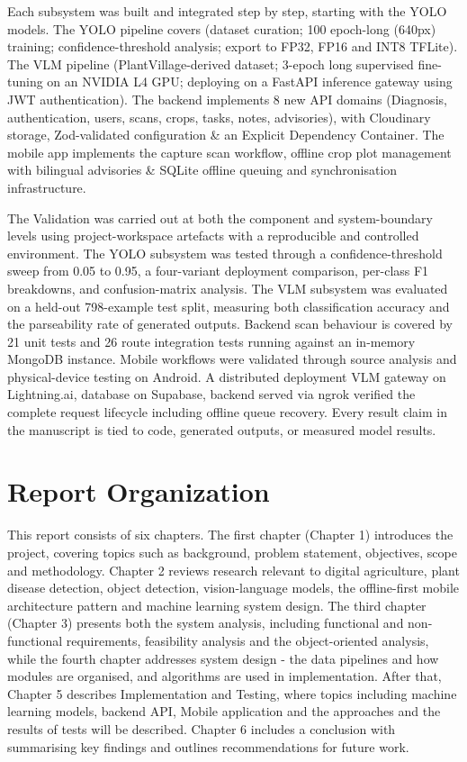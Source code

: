 
Each subsystem was built and integrated step by step, starting with the YOLO models. The YOLO pipeline covers (dataset curation; 100 epoch-long (640px) training; confidence-threshold analysis; export to FP32, FP16 and INT8 TFLite). The VLM pipeline (PlantVillage-derived dataset; 3-epoch long supervised fine-tuning on an NVIDIA L4 GPU; deploying on a FastAPI inference gateway using JWT authentication). The backend implements 8 new API domains (Diagnosis, authentication, users, scans, crops, tasks, notes, advisories), with Cloudinary storage, Zod-validated configuration \& an Explicit Dependency Container. The mobile app implements the capture scan workflow, offline crop plot management with bilingual advisories \& SQLite offline queuing and synchronisation infrastructure.


The Validation was carried out at both the component and system-boundary levels using project-workspace artefacts with a reproducible and controlled environment. The YOLO subsystem was tested through a confidence-threshold sweep from 0.05 to 0.95, a four-variant deployment comparison, per-class F1 breakdowns, and confusion-matrix analysis. The VLM subsystem was evaluated on a held-out 798-example test split, measuring both classification accuracy and the parseability rate of generated outputs. Backend scan behaviour is covered by 21 unit tests and 26 route integration tests running against an in-memory MongoDB instance. Mobile workflows were validated through source analysis and physical-device testing on Android. 
A distributed deployment VLM gateway on
Lightning.ai, database on Supabase, backend served via ngrok verified the complete request
lifecycle including offline queue recovery. Every result claim in the manuscript is tied to
code, generated outputs, or measured model results.

\section{Report Organization} This report consists of six chapters. The first chapter (Chapter 1) introduces the project, covering topics such as background, problem statement, objectives, scope and methodology. Chapter 2 reviews research relevant to digital agriculture, plant disease detection, object detection, vision-language models, the offline-first mobile architecture pattern and machine learning system design. The third chapter (Chapter 3) presents both the system analysis, including functional and non-functional requirements, feasibility analysis and the object-oriented analysis, while the fourth chapter addresses system design - the data pipelines and how modules are organised, and algorithms are used in implementation. After that, Chapter 5 describes Implementation and Testing, where topics including machine learning models, backend API, Mobile application and the approaches and the results of tests will be described. Chapter 6 includes a conclusion with summarising key findings and outlines recommendations for future work.